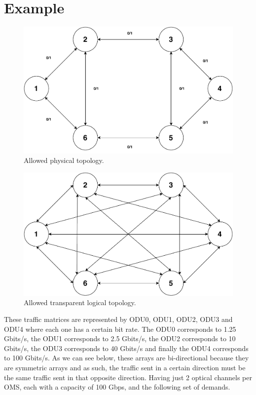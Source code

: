 \clearpage
\section{Example}
%

\begin{figure}[H]
	\centering
	\includegraphics[width=13cm]{sdf/heuristic/transparent/figures/physicalTopology}
	\caption{Allowed physical topology.}
	\label{allowed_physical_example}
\end{figure}

\begin{figure}[H]
	\centering
	\includegraphics[width=13cm]{sdf/heuristic/transparent/figures/logicalTopology}
	\caption{Allowed transparent logical topology.}
	\label{allowed_logical_example}
\end{figure}

These traffic matrices are represented by ODU0, ODU1, ODU2, ODU3 and ODU4 where each one has a certain bit rate.
The ODU0 corresponds to 1.25 Gbits/s, the ODU1 corresponds to 2.5 Gbits/s, the ODU2 corresponds to 10 Gbits/s, the ODU3 corresponds to 40 Gbits/s and finally the ODU4 corresponds to 100 Gbits/s.
As we can see below, these arrays are bi-directional because they are symmetric arrays and as such, the traffic sent in a certain direction must be the same traffic sent in that opposite direction.
Having just 2 optical channels per OMS, each with a capacity of 100 Gbps, and the following set of demands.\\\\

